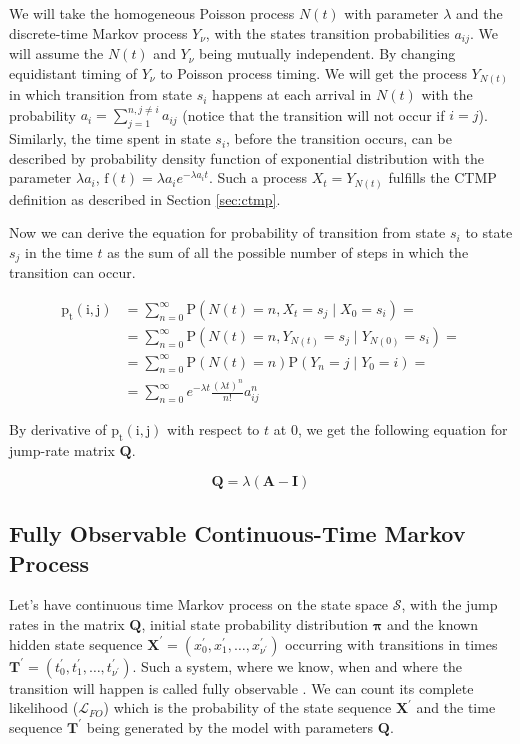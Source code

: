 \documentclass[thesis=M,english]{FITthesis}[2012/10/20]
\newcommand{\matr}[1]{\mathbf{#1}}
\begin{document}
We will take the homogeneous Poisson process $N(t)$ with parameter $\lambda$ and the discrete-time Markov process $Y_{\nu}$, with the states transition probabilities $a_{ij}$. We will assume the $N(t)$ and $Y_{\nu}$ being mutually independent. By changing equidistant timing of $Y_{\nu}$ to Poisson process timing. We will get the process $Y_{N(t)}$ in which transition from state $s_i$ happens at each arrival in $N(t)$ with the probability $a_i = \sum_{j = 1}^{ n ,j \neq i} a_{ij}$ (notice that the transition will not occur if $i=j$). Similarly, the time spent in state $s_i$, before the transition occurs, can be described by probability density function of exponential distribution with the parameter $\lambda a_i$, $\mathrm{f}(t)= \lambda a_i e^{- \lambda a_i t}$. Such a process $X_t = Y_{N(t)}$ fulfills the CTMP definition as described in Section \ref{sec:ctmp}. 

Now we can derive the equation for probability of transition from state $s_i$ to state $s_j$ in the time $t$ as the sum of all the possible number of steps in which the transition can occur. 

\begin{equation}
\begin{aligned}
\mathrm{p_t(i,j)} &= \sum_{n=0}^{\infty} \mathrm{P}( N(t) = n, X_t = s_j \mid X_0 = s_i )  = \\
                  &= \sum_{n=0}^{\infty} \mathrm{P}( N(t) = n, Y_{N(t)} = s_j \mid Y_{N(0)} = s_i )  = \\
                  &= \sum_{n=0}^{\infty} \mathrm{P}( N(t) = n ) \mathrm{P}( Y_n = j \mid Y_0 = i )  = \\
				  &= \sum_{n=0}^{\infty} e^{-\lambda t} \frac{ (\lambda t)^n}{n!} a_{ij}^n  
\end{aligned}
\end{equation} 

By derivative of $ \mathrm{p_t(i,j)} $ with respect to $t$ at $0$, we get the following equation for jump-rate matrix $\matr{Q}$.  

\begin{equation}
\matr{Q} = \lambda( \matr{A} - \matr{I} )
\end{equation}



\subsection{ Fully Observable Continuous-Time Markov Process }


Let's have continuous time Markov process on the state space $\mathcal{S}$, with the jump rates in the matrix $\matr{Q}$, initial state probability distribution $\boldsymbol\pi$ and the known hidden state sequence $\matr{X^{'}}= ( x_0^{'}, x_1^{'}, \dots, x_{\nu^{'}}^{'} ) $ occurring with transitions in times $\matr{T^{'}} = ( t_0^{'}, t_1^{'}, \dots, t_{\nu^{'}}^{'} )$. Such a system, where we know, when and where the transition will happen is called fully observable \cite{Li15}. We can count its complete likelihood ($\mathcal{L}_{FO}$) which is the probability of the state sequence $\matr{X^{'}}$ and the time sequence $\matr{T^{'}}$ being generated by the model with parameters $\matr{Q}$. 
\end{document}
